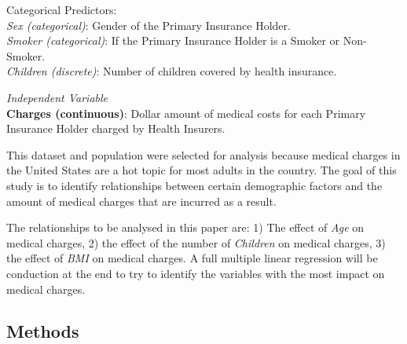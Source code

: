 \documentclass[]{article}
\begin{document}
Categorical Predictors:\\
\hspace*{0.333em}\hspace*{0.333em}\hspace*{0.333em}\hspace*{0.333em}\hspace*{0.333em}\hspace*{0.333em}\emph{Sex
(categorical)}: Gender of the Primary Insurance Holder.\\
\hspace*{0.333em}\hspace*{0.333em}\hspace*{0.333em}\hspace*{0.333em}\hspace*{0.333em}\hspace*{0.333em}\emph{Smoker
(categorical)}: If the Primary Insurance Holder is a Smoker or
Non-Smoker.\\
\hspace*{0.333em}\hspace*{0.333em}\hspace*{0.333em}\hspace*{0.333em}\hspace*{0.333em}\hspace*{0.333em}\emph{Children
(discrete)}: Number of children covered by health insurance.

\emph{Independent Variable}\\
\textbf{Charges (continuous)}: Dollar amount of medical costs for each
Primary Insurance Holder charged by Health Insurers.

This dataset and population were selected for analysis because medical
charges in the United States are a hot topic for most adults in the
country. The goal of this study is to identify relationships between
certain demographic factors and the amount of medical charges that are
incurred as a result.

The relationships to be analysed in this paper are: 1) The effect of
\emph{Age} on medical charges, 2) the effect of the number of
\emph{Children} on medical charges, 3) the effect of \emph{BMI} on
medical charges. A full multiple linear regression will be conduction at
the end to try to identify the variables with the most impact on medical
charges.

\hypertarget{methods}{%
\subsection{Methods}\label{methods}}
\end{document}
